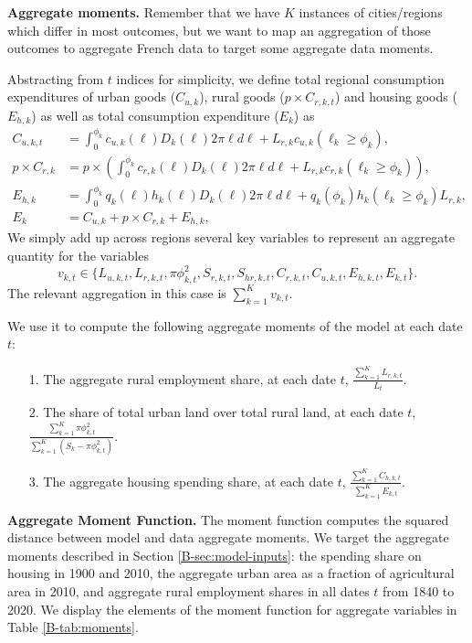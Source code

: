 \documentclass[11pt]{report}
\begin{document}
\textbf{Aggregate moments.} Remember that we have $K$ instances of cities/regions which differ in most outcomes, but we want to map an aggregation of those outcomes to aggregate French data to target some aggregate data moments. 

Abstracting from $t$ indices for simplicity, we define total regional consumption expenditures of urban goods ($C_{u,k}$), rural goods ($p \times C_{r,k,t}$) and housing goods ($E_{h,k}$) as well as total consumption expenditure ($E_{k}$) as
\begin{align*}
	C_{u,k,t} &= \int_0^{\phi_k} c_{u,k}(\ell) D_k(\ell) 2 \pi \ell d \ell + L_{r,k} c_{u,k}(\ell_k \geq \phi_k), \nonumber \\ 
p \times C_{r,k} &=  p \times \left( \int_0^{\phi_k} c_{r,k}(\ell) D_k(\ell) 2 \pi \ell d \ell + L_{r,k} c_{r,k}(\ell_k \geq \phi_k) \right), \nonumber  \\ 
	E_{h,k} &= \int_0^{\phi_k} q_{k}(\ell) h_{k}(\ell) D_k(\ell) 2 \pi \ell d \ell + q_{k}(\phi_k) h_{k}(\ell_k \geq \phi_k) L_{r,k}, \nonumber  \\
	E_{k} &= C_{u,k} + p \times C_{r,k} + E_{h,k},
\end{align*}
We simply add up across regions several key variables to represent an aggregate quantity for the variables $$v_{k,t} \in \{ L_{u,k,t}, L_{r,k,t}, \pi \phi_{k,t}^2, S_{r,k,t}, S_{hr,k,t}, C_{r,k,t}, C_{u,k,t}, E_{h,k,t}, E_{k,t}\}.$$ The relevant aggregation in this case is $\sum_{k=1}^K v_{k,t}$. 

We use it to compute the following aggregate moments of the model at each date $t$:
\begin{itemize}
\item[1.] The aggregate rural employment share, at each date $t$, $\frac{\sum_{k=1}^K L_{r,k,t}}{L_t}$. 
\item[2.] The share of total urban land over total rural land, at each date $t$, $ \frac{\sum_{k=1}^K \pi \phi_{k,t}^2}{\sum_{k=1}^K \left( S_k - \pi \phi_{k,t}^2\right) }$.
\item[3.] The aggregate housing spending share, at each date $t$, $\frac{\sum_{k=1}^K C_{h,k,t}}{\sum_{k=1}^K E_{k,t} }$.
\end{itemize}
\bigskip

\textbf{Aggregate Moment Function.} The moment function computes the squared distance between model and data aggregate moments. We target the aggregate moments described in Section \ref{B-sec:model-inputs}: the spending share on housing in 1900 and 2010, the aggregate urban area as a fraction of agricultural area in 2010, and aggregate rural employment shares in all dates $t$ from 1840 to 2020. We display the elements of the moment function for aggregate variables in Table \ref{B-tab:moments}.
\end{document}
